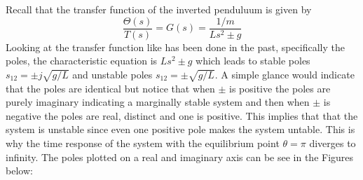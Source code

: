 Recall that the transfer function of the inverted penduluum is given by
\begin{equation}
  \frac{\Theta(s)}{T(s)} = G(s) = \frac{1/m}{Ls^2 \pm g}
\end{equation}
Looking at the transfer function like has been done in the past, specifically the poles, the characteristic equation is $Ls^2 \pm g$ which leads to stable poles $s_{12} = \pm j \sqrt{g/L}$ and unstable poles $s_{12} = \pm \sqrt{g/L}.$ A simple glance would indicate that the poles are identical but notice that when $\pm$ is positive the poles are purely imaginary indicating a marginally stable system and then when $\pm$ is negative the poles are real, distinct and one is positive. This implies that that the system is unstable since even one positive pole makes the system untable. This is why the time response of the system with the equilibrium point $\theta=\pi$ diverges to infinity. The poles plotted on a real and imaginary axis can be see in the Figures below:
